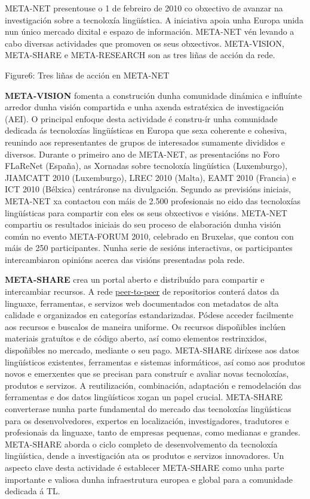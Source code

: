 \begin{multicols}{2}
\begin{itemize}
\begin{multicols}{2}

  META-NET presentouse o 1 de febreiro de 2010 co obxectivo de avanzar na investigación sobre a tecnoloxía lingüística. A iniciativa apoia unha Europa unida nun único mercado dixital e espazo de información. META-NET vén levando a cabo diversas actividades que promoven os seus obxectivos. META-VISION, META-SHARE e META-RESEARCH son as tres liñas de acción da rede.

Figure6: Tres liñas de acción en META-NET

\textbf{META-VISION} fomenta a construción dunha comunidade dinámica e influínte arredor dunha visión compartida e unha axenda estratéxica de investigación (AEI). O principal enfoque desta actividade é constru-ír unha comunidade dedicada ás tecnoloxías lingüísticas en Europa que sexa coherente e cohesiva, reunindo aos representantes de grupos de interesados sumamente divididos e diversos. Durante o primeiro ano de META-NET, as presentacións no Foro FLaReNet (España), as Xornadas sobre tecnoloxía lingüística (Luxemburgo), JIAMCATT 2010 (Luxemburgo), LREC 2010 (Malta), EAMT 2010 (Francia) e ICT 2010 (Bélxica) centráronse na divulgación. Segundo as previsións iniciais, META-NET xa contactou con máis de 2.500 profesionais no eido das tecnoloxías lingüísticas para compartir con eles os seus obxectivos e visións. META-NET compartiu os resultados iniciais do seu proceso de elaboración dunha visión común no evento META-FORUM 2010, celebrado en Bruxelas, que contou con máis de 250 participantes. Nunha serie de sesións interactivas, os participantes intercambiaron opinións acerca das visións presentadas pola rede. 

\textbf{META-SHARE} crea un portal aberto e distribuído para compartir e intercambiar recursos. A rede \uline{peer-to-peer} de repositorios conterá datos da linguaxe, ferramentas, e servizos web documentados con metadatos de alta calidade e organizados en categorías estandarizadas. Pódese acceder facilmente aos recursos e buscalos de maneira uniforme. Os recursos dispoñibles inclúen materiais gratuítos e de código aberto, así como elementos restrinxidos, dispoñibles no mercado, mediante o seu pago. META-SHARE diríxese aos datos lingüísticos existentes, ferramentas e sistemas informáticos, así como aos produtos novos e emerxentes que se precisan para construír e avaliar novas tecnoloxías, produtos e servizos. A reutilización, combinación, adaptación e remodelación das ferramentas e dos datos lingüísticos xogan un papel crucial. META-SHARE converterase nunha parte fundamental do mercado das tecnoloxías lingüísticas para os desenvolvedores, expertos en localización, investigadores, tradutores e profesionais da linguaxe, tanto de empresas pequenas, como medianas e grandes. META-SHARE aborda o ciclo completo de desenvolvemento da tecnoloxía lingüística, dende a investigación ata os produtos e servizos innovadores. Un aspecto clave desta actividade é establecer META-SHARE como unha parte importante e valiosa dunha infraestrutura europea e global para a comunidade dedicada á TL. 


\end{multicols}
\end{itemize}
\end{multicols}
